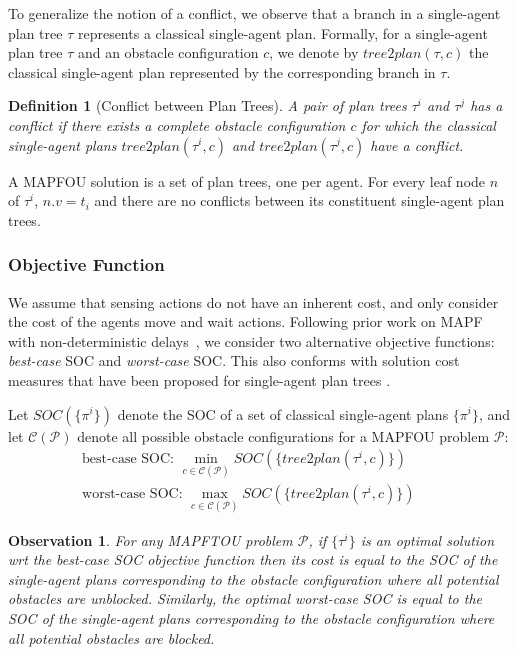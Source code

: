 \documentclass[letterpaper]{article} %
\newcommand{\blocked}{\textit{blocked}}
\newcommand{\unblocked}{\textit{unblocked}}
\newcommand{\toplan}{\textit{tree2plan}}
\newtheorem{observation}{Observation}
\newtheorem{definition}{Definition}
\begin{document}
To generalize the notion of a conflict, we observe that a 
branch in a single-agent plan tree $\tau$ represents a classical single-agent plan. Formally, for a single-agent plan tree $\tau$ and an obstacle configuration $c$, we denote by $\toplan(\tau,c)$ the classical single-agent plan represented by the corresponding branch in $\tau$.  
\begin{definition}[Conflict between Plan Trees]
A pair of plan trees $\tau^i$ and $\tau^j$ has a conflict if there exists a complete obstacle configuration $c$ 
for which the classical single-agent plans $\toplan(\tau^i,c)$ and $\toplan(\tau^j,c)$ have a conflict. 
\label{def:conflicting-plan-trees}
\end{definition}
A  MAPFOU solution is a set of plan trees, one per agent. For every leaf node $n$ of $\tau^i$, $n.v=t_i$ and there are no conflicts between its constituent single-agent plan trees. 



\subsubsection*{Objective Function}


We assume that sensing actions do not have an inherent cost, and only consider the cost of the agents move and wait actions. 
Following prior work on MAPF with non-deterministic delays~\cite{shahar2021safe}, we consider two alternative objective functions: \emph{best-case} SOC and \emph{worst-case} SOC.
This also conforms with solution cost measures that have been proposed for single-agent plan trees \cite{shmaryahu2019comparative}. 


Let $SOC(\{\pi^i\})$ denote the SOC of a set of classical single-agent plans $\{\pi^i\}$, and let $\mathcal{C}(\mathcal{P})$ denote all possible obstacle configurations for a MAPFOU problem $\mathcal{P}$:
\begin{eqnarray}
 \mbox{best-case SOC: } \min_{c\in\mathcal{C}(\mathcal{P})} SOC(\{\toplan(\tau^i,c)\}) &&\\
 \mbox{worst-case SOC: } \max_{c\in\mathcal{C}(\mathcal{P})} SOC(\{\toplan(\tau^i,c)\})&& 
\end{eqnarray}


\begin{observation}
For any MAPFTOU problem $\mathcal{P}$, if $\{\tau^i\}$ is an optimal solution wrt 
the best-case SOC objective function then its cost is equal to the SOC of the single-agent plans corresponding to the obstacle configuration where all potential obstacles are \unblocked. 
Similarly, the optimal worst-case SOC is equal to the SOC of the single-agent plans corresponding to the obstacle configuration where all potential obstacles are \blocked. 
\label{obs:best-and-worst}
\end{observation}
\end{document}

